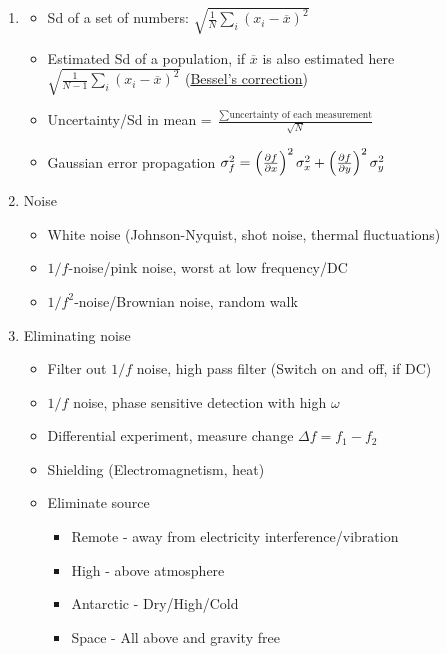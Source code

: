 \documentclass{article}
\theoremstyle{remark}
\theoremstyle{remark}
\begin{document}
\begin{enumerate}
\begin{itemize}
        \end{itemize}
    \item \begin{itemize}
        \item Sd of a set of numbers: $\sqrt{\frac{1}{N}\sum_i(x_i-\overline{x})^2}$
        \item Estimated Sd of a population, if $\overline{x}$ is also estimated here $\sqrt{\frac{1}{N-1}\sum_i(x_i-\overline{x})^2}$ (\href{https://gregorygundersen.com/blog/2019/01/11/bessel/}{Bessel's correction})
        \item Uncertainty/Sd in mean = $\frac{\sum\text{uncertainty of each measurement}}{\sqrt{N}}$
        \item Gaussian error propagation $\sigma_f^2=\left(\pdv{f}{x}\right)^2\sigma_x^2+\left(\pdv{f}{y}\right)^2\sigma_y^2$
    \end{itemize}
    \item Noise\begin{itemize}
            \item White noise (Johnson-Nyquist, shot noise, thermal fluctuations)
            \item $1/f$-noise/pink noise, worst at low frequency/DC
            \item $1/f^2$-noise/Brownian noise, random walk
        \end{itemize}
    \item Eliminating noise\begin{itemize}
            \item Filter out $1/f$ noise, high pass filter (Switch on and off, if DC)
            \item $1/f$ noise, phase sensitive detection with high $\omega$
            \item Differential experiment, measure change $\Delta f=f_1-f_2$
            \item Shielding (Electromagnetism, heat)
            \item Eliminate source\begin{itemize}
                \item Remote - away from electricity interference/vibration
                \item High - above atmosphere
                \item Antarctic - Dry/High/Cold
                \item Space - All above and gravity free
            \end{itemize}
        \end{itemize}

\end{enumerate}
\end{document}

